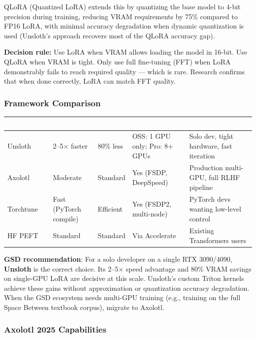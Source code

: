 \documentclass[11pt,letterpaper]{article}
\newcommand{\tableheader}[1]{\textbf{\sffamily\textcolor{white}{#1}}}
\begin{document}
QLoRA (Quantized LoRA) extends this by quantizing the base model to 4-bit precision during training, reducing VRAM requirements by 75\% compared to FP16 LoRA, with minimal accuracy degradation when dynamic quantization is used (Unsloth's approach recovers most of the QLoRA accuracy gap).

\textbf{Decision rule:} Use LoRA when VRAM allows loading the model in 16-bit. Use QLoRA when VRAM is tight. Only use full fine-tuning (FFT) when LoRA demonstrably fails to reach required quality --- which is rare. Research confirms that when done correctly, LoRA can match FFT quality.

\subsubsection{Framework Comparison}

\begin{center}
\begin{tabularx}{\textwidth}{L{2.5cm}L{2cm}L{2cm}L{2.5cm}X}
\toprule
{}
\tableheader{Framework} & \tableheader{Speed} & \tableheader{VRAM} & \tableheader{Multi-GPU} & \tableheader{Best For} \\
\midrule
Unsloth & 2--5$\times$ faster & 80\% less & OSS: 1 GPU only; Pro: 8+ GPUs & Solo dev, tight hardware, fast iteration \\
Axolotl & Moderate & Standard & Yes (FSDP, DeepSpeed) & Production multi-GPU, full RLHF pipeline \\
Torchtune & Fast (PyTorch compile) & Efficient & Yes (FSDP2, multi-node) & PyTorch devs wanting low-level control \\
HF PEFT & Standard & Standard & Via Accelerate & Existing Transformers users \\
\bottomrule
\end{tabularx}
\end{center}

\textbf{GSD recommendation}: For a solo developer on a single RTX 3090/4090, \textbf{Unsloth} is the correct choice. Its 2--5$\times$ speed advantage and 80\% VRAM savings on single-GPU LoRA are decisive at this scale. Unsloth's custom Triton kernels achieve these gains without approximation or quantization accuracy degradation. When the GSD ecosystem needs multi-GPU training (e.g., training on the full Space Between textbook corpus), migrate to Axolotl.

\subsubsection{Axolotl 2025 Capabilities}
\end{document}
